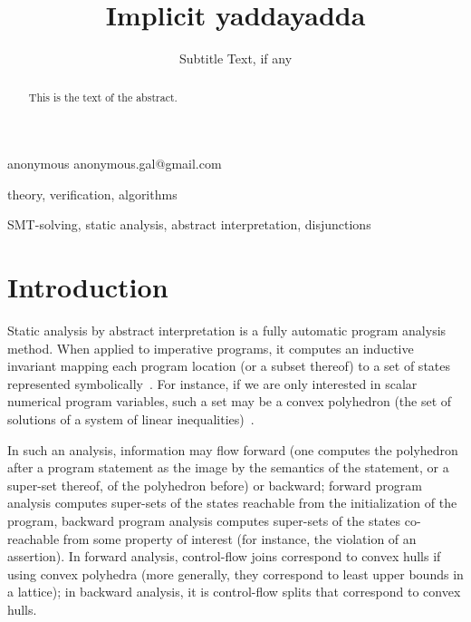 \documentclass[preprint]{sigplanconf}
\begin{document}
\copyrightdata{[to be supplied]} 


\title{Implicit yaddayadda}
\subtitle{Subtitle Text, if any}

           {anonymous}
           {anonymous.gal@gmail.com}

\maketitle

\begin{abstract}
This is the text of the abstract.
\end{abstract}


\terms
theory, verification, algorithms

\keywords
SMT-solving, static analysis, abstract interpretation, disjunctions

\section{Introduction}
Static analysis by abstract interpretation is a fully automatic program analysis method. When applied to imperative programs, it computes an inductive invariant mapping each program location (or a subset thereof) to a set of states represented symbolically~\cite{CousotCousot_JLC92}.
For instance, if we are only interested in scalar numerical program variables, such a set may be a convex polyhedron (the set of solutions of a system of linear inequalities)~\cite{CousotHalbwachs78,PPL,BagnaraHZ08SCP}.

In such an analysis, information may flow forward (one computes the polyhedron after a program statement as the image by the semantics of the statement, or a super-set thereof, of the polyhedron before) or backward;
forward program analysis computes super-sets of the states reachable from the initialization of the program, backward program analysis computes super-sets of the states co-reachable from some property of interest (for instance, the violation of an assertion).
In forward analysis, control-flow joins correspond to convex hulls if using convex polyhedra (more generally, they correspond to least upper bounds in a lattice); in backward analysis, it is control-flow splits that correspond to convex hulls.
\end{document}
